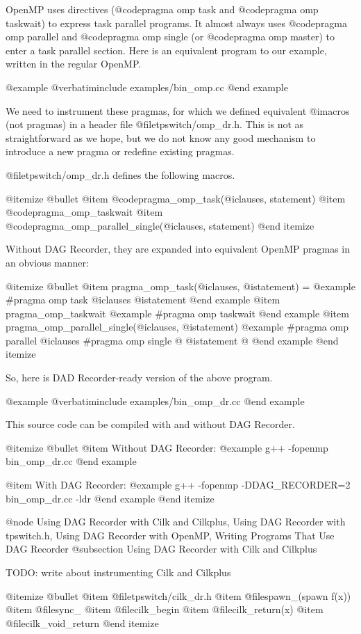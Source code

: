 OpenMP uses directives (@code{pragma omp task} and @code{pragma omp
taskwait}) to express task parallel programs.  It almost always uses
@code{pragma omp parallel} and @code{pragma omp single} (or @code{pragma
omp master}) to enter a task parallel section.  Here is an equivalent
program to our example, written in the regular OpenMP.

@example
@verbatiminclude examples/bin_omp.cc
@end example

We need to instrument these pragmas, for which we defined equivalent
@i{macros} (not pragmas) in a header file @file{tpswitch/omp_dr.h}.
This is not as straightforward as we hope, but we do not know any good
mechanism to introduce a new pragma or redefine existing pragmas.

@file{tpswitch/omp_dr.h} defines the following macros.

@itemize @bullet
@item @code{pragma_omp_task(@i{clauses, statement})}
@item @code{pragma_omp_taskwait}
@item @code{pragma_omp_parallel_single(@i{clauses, statement})}
@end itemize

Without DAG Recorder, they are expanded into equivalent OpenMP pragmas
in an obvious manner:

@itemize @bullet
@item pragma_omp_task(@i{clauses}, @i{statement}) =
@example
#pragma omp task @i{clauses}
  @i{statement}
@end example
@item pragma_omp_taskwait 
@example
#pragma omp taskwait
@end example
@item pragma_omp_parallel_single(@i{clauses}, @i{statement})
@example
#pragma omp parallel @i{clauses}
#pragma omp single
@{
  @i{statement}
@}
@end example
@end itemize

So, here is DAD Recorder-ready version of the above program.

@example
@verbatiminclude examples/bin_omp_dr.cc
@end example

This source code can be compiled with and without DAG Recorder.

@itemize @bullet
@item Without DAG Recorder:
@example
g++ -fopenmp bin_omp_dr.cc 
@end example

@item With DAG Recorder:
@example
g++ -fopenmp -DDAG_RECORDER=2 bin_omp_dr.cc -ldr
@end example
@end itemize

@node Using DAG Recorder with Cilk and Cilkplus, Using DAG Recorder with tpswitch.h, Using DAG Recorder with OpenMP, Writing Programs That Use DAG Recorder
@subsection Using DAG Recorder with Cilk and Cilkplus

TODO: write about instrumenting Cilk and Cilkplus

@itemize @bullet
@item @file{tpswitch/cilk_dr.h}
@item @file{spawn_(spawn f(x))}
@item @file{sync_}
@item @file{cilk_begin}
@item @file{cilk_return(x)}
@item @file{cilk_void_return}
@end itemize

